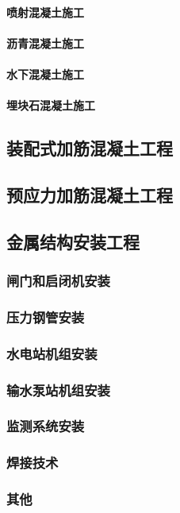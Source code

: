 \documentclass[UTF8]{../../ApplicationUniverse}
\begin{document}
            \paragraph{喷射混凝土施工}
            \paragraph{沥青混凝土施工}
            \paragraph{水下混凝土施工}
            \paragraph{埋块石混凝土施工}
    \subsection{装配式加筋混凝土工程}
    \subsection{预应力加筋混凝土工程}
    \subsection{金属结构安装工程}
        \subsubsection{闸门和启闭机安装}
        \subsubsection{压力钢管安装}
        \subsubsection{水电站机组安装}
        \subsubsection{输水泵站机组安装}
        \subsubsection{监测系统安装}
        \subsubsection{焊接技术}
        \subsubsection{其他}
\end{document}
